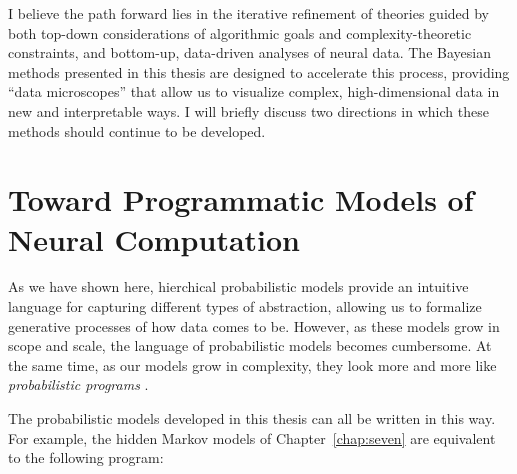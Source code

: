 
I believe the path forward lies in the iterative refinement of
theories guided by both top-down considerations of algorithmic goals
and complexity-theoretic constraints, and bottom-up, data-driven
analyses of neural data. The Bayesian methods presented in this thesis
are designed to accelerate this process, providing ``data
microscopes'' that allow us to visualize complex, high-dimensional
data in new and interpretable ways. I will briefly discuss two
directions in which these methods should continue to be developed.

\section{Toward Programmatic Models of Neural Computation}
As we have
shown here, hierchical probabilistic models provide an intuitive
language for capturing different types of abstraction, allowing us to
formalize generative processes of how data comes to be. However, as
these models grow in scope and scale, the language of probabilistic
models becomes cumbersome. At the same time, as our models grow in
complexity, they look more and more like \emph{probabilistic
  programs} \citep{goodman2008church}.

The probabilistic models developed in this thesis can all be written in
this way. For example, the hidden Markov models of
Chapter~\ref{chap:seven} are equivalent to the following program:

